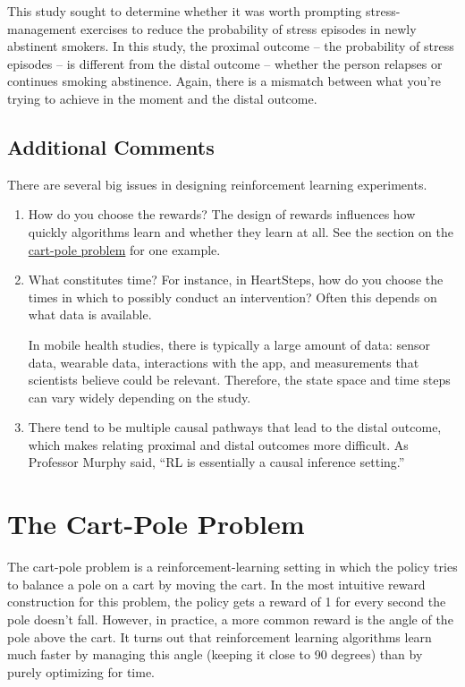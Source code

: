 \documentclass[11pt]{article}
\begin{document}
This study sought to determine whether it was worth prompting stress-management exercises to reduce the probability of stress episodes in newly abstinent smokers. In this study, the proximal outcome -- the probability of stress episodes -- is different from the distal outcome -- whether the person relapses or continues smoking abstinence. Again, there is a mismatch between what you're trying to achieve in the moment and the distal outcome.


\subsection{Additional Comments}

There are several big issues in designing reinforcement learning experiments. 

\begin{enumerate}
    \item How do you choose the rewards? The design of rewards influences how quickly algorithms learn and whether they learn at all. See the section on the \hyperref[sec:cartpole]{cart-pole problem} for one example.
    
    \item What constitutes time? For instance, in HeartSteps, how do you choose the times in which to possibly conduct an intervention? Often this depends on what data is available.

    In mobile health studies, there is typically a large amount of data: sensor data, wearable data, interactions with the app, and measurements that scientists believe could be relevant. Therefore, the state space and time steps can vary widely depending on the study. 
    
    \item There tend to be multiple causal pathways that lead to the distal outcome, which makes relating proximal and distal outcomes more difficult. As Professor Murphy said, ``RL is essentially a causal inference setting.''
\end{enumerate}

\section{The Cart-Pole Problem}
\label{sec:cartpole}

The cart-pole problem is a reinforcement-learning setting in which the policy tries to balance a pole on a cart by moving the cart. In the most intuitive reward construction for this problem, the policy gets a reward of 1 for every second the pole doesn't fall. However, in practice, a more common reward is the angle of the pole above the cart. It turns out that reinforcement learning algorithms learn much faster by managing this angle (keeping it close to 90 degrees) than by purely optimizing for time. 


\end{document}
